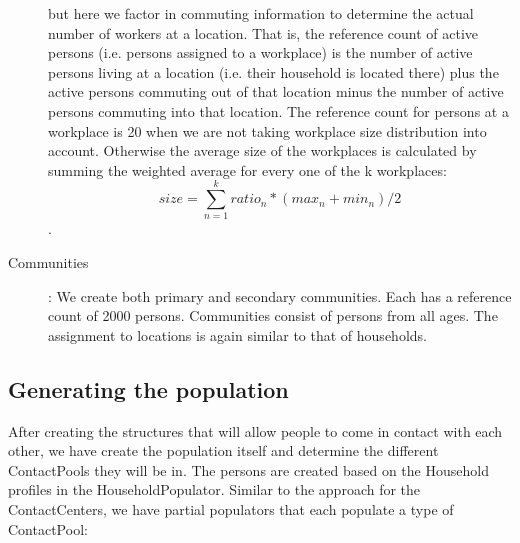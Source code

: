 \begin{description}
        but here we factor in commuting information to determine the actual number of workers at a location.
        That is, the reference count of active persons (i.e. persons assigned to a workplace) is 
        the number of active persons living at a location (i.e. their household is located there)
        plus the active persons commuting out of that location minus the number of active persons
        commuting into that location. 
        The reference count for persons at a workplace is 20 when we are not taking workplace size distribution into account. Otherwise the average size of the workplaces is calculated by summing the weighted average for every one of the k workplaces:
        $$size = \sum_{n=1}^{k} ratio_n * (max_n + min_n) / 2$$.
    \item[Communities]:
        We create both primary and secondary communities. Each has a reference count of 2000 persons. 
        Communities consist of persons from all ages. 
        The assignment to locations is again similar to that of households.
\end{description}

\subsection{Generating the population}
\label{subsection:genpop}
After creating the structures that will allow people to come in contact with each other, we have create the population itself and determine the different ContactPools they will be in. The persons are created based on the Household profiles in the HouseholdPopulator. Similar to the approach for the ContactCenters, we have partial populators that 
each populate a type of ContactPool:

